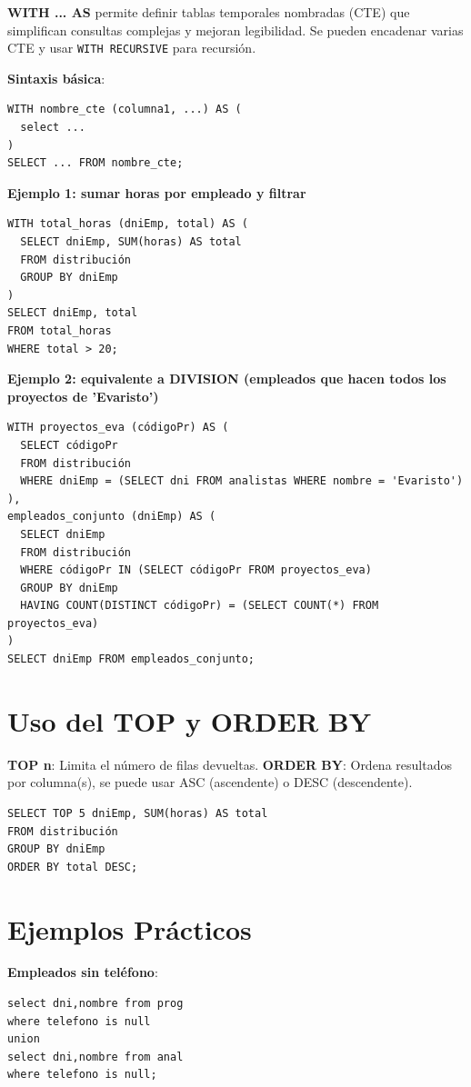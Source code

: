 \documentclass[10pt,a4paper,twocolumn]{article}
\begin{document}
\textbf{WITH ... AS} permite definir tablas temporales nombradas (CTE) que simplifican consultas complejas y mejoran legibilidad. Se pueden encadenar varias CTE y usar \texttt{WITH RECURSIVE} para recursión.

\textbf{Sintaxis básica}:
\begin{lstlisting}
WITH nombre_cte (columna1, ...) AS (
  select ...
)
SELECT ... FROM nombre_cte;
\end{lstlisting}

\textbf{Ejemplo 1: sumar horas por empleado y filtrar}
\begin{lstlisting}
WITH total_horas (dniEmp, total) AS (
  SELECT dniEmp, SUM(horas) AS total
  FROM distribución
  GROUP BY dniEmp
)
SELECT dniEmp, total
FROM total_horas
WHERE total > 20;
\end{lstlisting}

\textbf{Ejemplo 2: equivalente a DIVISION (empleados que hacen todos los proyectos de 'Evaristo')}
\begin{lstlisting}
WITH proyectos_eva (códigoPr) AS (
  SELECT códigoPr
  FROM distribución
  WHERE dniEmp = (SELECT dni FROM analistas WHERE nombre = 'Evaristo')
),
empleados_conjunto (dniEmp) AS (
  SELECT dniEmp
  FROM distribución
  WHERE códigoPr IN (SELECT códigoPr FROM proyectos_eva)
  GROUP BY dniEmp
  HAVING COUNT(DISTINCT códigoPr) = (SELECT COUNT(*) FROM proyectos_eva)
)
SELECT dniEmp FROM empleados_conjunto;
\end{lstlisting}

\section{Uso del TOP y ORDER BY}
\textbf{TOP n}: Limita el número de filas devueltas.
\textbf{ORDER BY}: Ordena resultados por columna(s), se puede usar ASC (ascendente) o DESC (descendente).
\begin{lstlisting}
SELECT TOP 5 dniEmp, SUM(horas) AS total
FROM distribución
GROUP BY dniEmp
ORDER BY total DESC;
\end{lstlisting}

\section{Ejemplos Prácticos}

\textbf{Empleados sin teléfono}:
\begin{lstlisting}
select dni,nombre from prog
where telefono is null
union
select dni,nombre from anal
where telefono is null;
\end{lstlisting}
\end{document}
